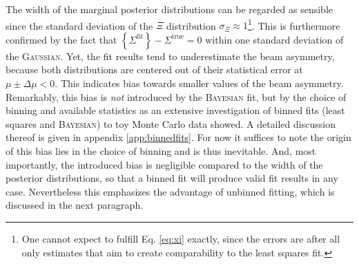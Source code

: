 The width of the marginal posterior distributions can be regarded as sensible since the standard deviation of the $\Xi$ distribution $\sigma_\Xi\approx1$\footnote{One cannot expect to fulfill Eq. \eqref{eq:xi} exactly, since the errors are after all only estimates that aim to create comparability to the least squares fit.}. This is furthermore confirmed by the fact that $\left\{\Sigma^\text{fit}\right\}-\Sigma^\text{true}=0$ within one standard deviation of the \textsc{Gaussian}. Yet, the fit results tend to underestimate the beam asymmetry, because both distributions are centered out of their statistical error at $\mu\pm\Delta\mu<0$. This indicates bias towards smaller values of the beam asymmetry. Remarkably, this bias is \emph{not} introduced by the \textsc{Bayesian} fit, but by the choice of binning and available statistics as an extensive investigation of binned fits (least squares and \textsc{Bayesian}) to toy Monte Carlo data showed. A detailed discussion thereof is given in appendix \ref{app:binnedfits}. For now it suffices to note the origin of this bias lies in the choice of binning and is thus inevitable. And, most importantly, the introduced bias is negligible compared to the width of the posterior distributions, so that a binned fit will produce valid fit results in any case. Nevertheless this emphasizes the advantage of unbinned fitting, which is discussed in the next paragraph.

